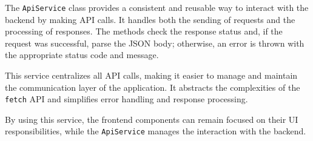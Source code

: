 The \texttt{ApiService} class provides a consistent and reusable way to interact with the backend by making API calls. It handles both the sending of requests and the processing of responses. The methods check the response status and, if the request was successful, parse the JSON body; otherwise, an error is thrown with the appropriate status code and message.

This service centralizes all API calls, making it easier to manage and maintain the communication layer of the application. It abstracts the complexities of the \texttt{fetch} API and simplifies error handling and response processing.

By using this service, the frontend components can remain focused on their UI responsibilities, while the \texttt{ApiService} manages the interaction with the backend.


